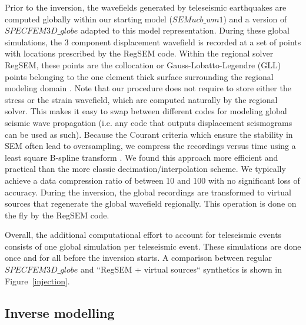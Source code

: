 \documentclass[12pt]{article}
\begin{document}
Prior to the inversion, the wavefields generated by teleseismic earthquakes are computed globally within our starting model ($SEMucb\_wm1$) and a version of $SPECFEM3D\_globe$ \citep{komatitsch2002spectrala} adapted to this model representation. 
During these global simulations, the 3 component displacement wavefield is recorded at a set of points with locations prescribed by the RegSEM code.
Within the regional solver RegSEM, these points are the collocation or Gauss-Lobatto-Legendre (GLL) points belonging to the one element thick surface surrounding the regional modeling domain \citep[see][]{masson2013numerical}. 
Note that our procedure does not require to store either the stress or the strain wavefield, which are computed naturally by the regional solver. This makes it easy to swap between different codes for modeling global seismic wave propagation (i.e. any code that outputs displacement seismograms can be used as such).
Because the Courant criteria which ensure the stability in SEM often lead to oversampling, we compress the recordings versus time using a least square B-spline transform \citep{unser1993a,unser1993b}. We found this  approach more efficient and practical than the more classic decimation/interpolation scheme.
We typically achieve a data compression ratio of between 10 and 100 with no significant loss of accuracy. 
During the inversion, the global recordings are transformed to virtual sources that regenerate the global wavefield regionally. 
This operation is done on the fly by the RegSEM code.

Overall, the additional computational effort to account for teleseismic events consists of one global simulation per teleseismic event. These simulations are done once and for all before the inversion starts. A comparison between regular $SPECFEM3D\_globe$ and ``RegSEM + virtual sources`` synthetics is shown in Figure~\ref{injection}.

\subsection{Inverse modelling}
\end{document}
